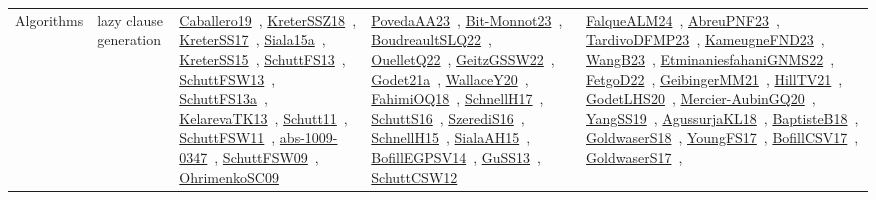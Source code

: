 {\begin{longtable}{lp{3cm}>{\raggedright\arraybackslash}p{6cm}>{\raggedright\arraybackslash}p{6cm}>{\raggedright\arraybackslash}p{8cm}}
Algorithms & lazy clause generation & \href{../works/Caballero19.pdf}{Caballero19}~\cite{Caballero19}, \href{../works/KreterSSZ18.pdf}{KreterSSZ18}~\cite{KreterSSZ18}, \href{../works/KreterSS17.pdf}{KreterSS17}~\cite{KreterSS17}, \href{../works/Siala15a.pdf}{Siala15a}~\cite{Siala15a}, \href{../works/KreterSS15.pdf}{KreterSS15}~\cite{KreterSS15}, \href{../works/SchuttFS13.pdf}{SchuttFS13}~\cite{SchuttFS13}, \href{../works/SchuttFSW13.pdf}{SchuttFSW13}~\cite{SchuttFSW13}, \href{../works/SchuttFS13a.pdf}{SchuttFS13a}~\cite{SchuttFS13a}, \href{../works/KelarevaTK13.pdf}{KelarevaTK13}~\cite{KelarevaTK13}, \href{../works/Schutt11.pdf}{Schutt11}~\cite{Schutt11}, \href{../works/SchuttFSW11.pdf}{SchuttFSW11}~\cite{SchuttFSW11}, \href{../works/abs-1009-0347.pdf}{abs-1009-0347}~\cite{abs-1009-0347}, \href{../works/SchuttFSW09.pdf}{SchuttFSW09}~\cite{SchuttFSW09}, \href{../works/OhrimenkoSC09.pdf}{OhrimenkoSC09}~\cite{OhrimenkoSC09} & \href{../works/PovedaAA23.pdf}{PovedaAA23}~\cite{PovedaAA23}, \href{../works/Bit-Monnot23.pdf}{Bit-Monnot23}~\cite{Bit-Monnot23}, \href{../works/BoudreaultSLQ22.pdf}{BoudreaultSLQ22}~\cite{BoudreaultSLQ22}, \href{../works/OuelletQ22.pdf}{OuelletQ22}~\cite{OuelletQ22}, \href{../works/GeitzGSSW22.pdf}{GeitzGSSW22}~\cite{GeitzGSSW22}, \href{../works/Godet21a.pdf}{Godet21a}~\cite{Godet21a}, \href{../works/WallaceY20.pdf}{WallaceY20}~\cite{WallaceY20}, \href{../works/FahimiOQ18.pdf}{FahimiOQ18}~\cite{FahimiOQ18}, \href{../works/SchnellH17.pdf}{SchnellH17}~\cite{SchnellH17}, \href{../works/SchuttS16.pdf}{SchuttS16}~\cite{SchuttS16}, \href{../works/SzerediS16.pdf}{SzerediS16}~\cite{SzerediS16}, \href{../works/SchnellH15.pdf}{SchnellH15}~\cite{SchnellH15}, \href{../works/SialaAH15.pdf}{SialaAH15}~\cite{SialaAH15}, \href{../works/BofillEGPSV14.pdf}{BofillEGPSV14}~\cite{BofillEGPSV14}, \href{../works/GuSS13.pdf}{GuSS13}~\cite{GuSS13}, \href{../works/SchuttCSW12.pdf}{SchuttCSW12}~\cite{SchuttCSW12} & \href{../works/FalqueALM24.pdf}{FalqueALM24}~\cite{FalqueALM24}, \href{../works/AbreuPNF23.pdf}{AbreuPNF23}~\cite{AbreuPNF23}, \href{../works/TardivoDFMP23.pdf}{TardivoDFMP23}~\cite{TardivoDFMP23}, \href{../works/KameugneFND23.pdf}{KameugneFND23}~\cite{KameugneFND23}, \href{../works/WangB23.pdf}{WangB23}~\cite{WangB23}, \href{../works/EtminaniesfahaniGNMS22.pdf}{EtminaniesfahaniGNMS22}~\cite{EtminaniesfahaniGNMS22}, \href{../works/FetgoD22.pdf}{FetgoD22}~\cite{FetgoD22}, \href{../works/GeibingerMM21.pdf}{GeibingerMM21}~\cite{GeibingerMM21}, \href{../works/HillTV21.pdf}{HillTV21}~\cite{HillTV21}, \href{../works/GodetLHS20.pdf}{GodetLHS20}~\cite{GodetLHS20}, \href{../works/Mercier-AubinGQ20.pdf}{Mercier-AubinGQ20}~\cite{Mercier-AubinGQ20}, \href{../works/YangSS19.pdf}{YangSS19}~\cite{YangSS19}, \href{../works/AgussurjaKL18.pdf}{AgussurjaKL18}~\cite{AgussurjaKL18}, \href{../works/BaptisteB18.pdf}{BaptisteB18}~\cite{BaptisteB18}, \href{../works/GoldwaserS18.pdf}{GoldwaserS18}~\cite{GoldwaserS18}, \href{../works/YoungFS17.pdf}{YoungFS17}~\cite{YoungFS17}, \href{../works/BofillCSV17.pdf}{BofillCSV17}~\cite{BofillCSV17}, \href{../works/GoldwaserS17.pdf}{GoldwaserS17}~\cite{GoldwaserS17}, 
\end{longtable}}
